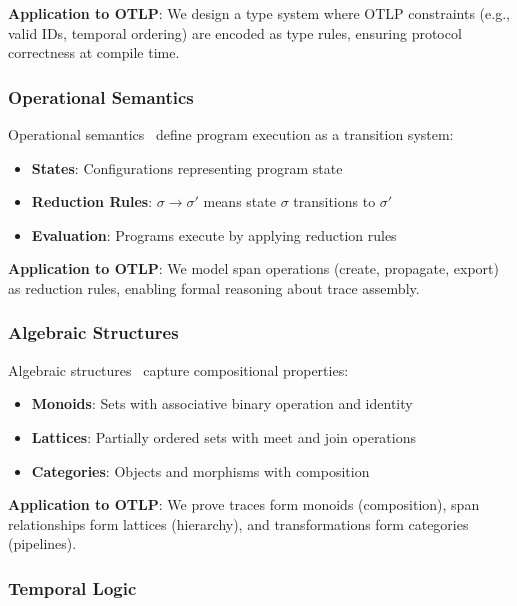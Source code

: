 \textbf{Application to OTLP}: We design a type system where OTLP constraints (e.g., valid IDs, temporal ordering) are encoded as type rules, ensuring protocol correctness at compile time.

\subsubsection{Operational Semantics}
\label{sec:operational-semantics}

Operational semantics~\cite{plotkin1981structural} define program execution as a transition system:

\begin{itemize}
\item \textbf{States}: Configurations representing program state
\item \textbf{Reduction Rules}: $\sigma \rightarrow \sigma'$ means state $\sigma$ transitions to $\sigma'$
\item \textbf{Evaluation}: Programs execute by applying reduction rules
\end{itemize}

\textbf{Application to OTLP}: We model span operations (create, propagate, export) as reduction rules, enabling formal reasoning about trace assembly.

\subsubsection{Algebraic Structures}
\label{sec:algebraic-structures}

Algebraic structures~\cite{maclane1998categories,birkhoff1940lattice} capture compositional properties:

\begin{itemize}
\item \textbf{Monoids}: Sets with associative binary operation and identity
\item \textbf{Lattices}: Partially ordered sets with meet and join operations
\item \textbf{Categories}: Objects and morphisms with composition
\end{itemize}

\textbf{Application to OTLP}: We prove traces form monoids (composition), span relationships form lattices (hierarchy), and transformations form categories (pipelines).

\subsubsection{Temporal Logic}
\label{sec:temporal-logic}

